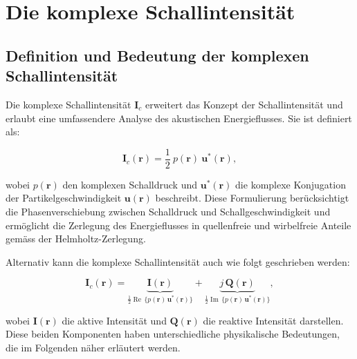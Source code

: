%
%
%
%
\section{Die komplexe Schallintensität
\label{helmholtz:section:Schallintensitaet}}

\subsection{Definition und Bedeutung der komplexen Schallintensität
\label{helmholtz:subsection:def_Schallintensitaet}}

Die komplexe Schallintensität $\mathbf{I}_c$ erweitert das Konzept der Schallintensität und erlaubt eine umfassendere Analyse des akustischen Energieflusses. Sie ist definiert als:

\begin{equation}
\mathbf{I}_c (\mathbf{r}) = \frac{1}{2} \: p(\mathbf{r}) \: \mathbf{u}^{*}(\mathbf{r}),
\label{helmholtz:equationIntensitaetKomplex}
\end{equation}

\noindent wobei $p(\mathbf{r})$ den komplexen Schalldruck und $\mathbf{u}^{*}(\mathbf{r})$ die komplexe Konjugation der Partikelgeschwindigkeit $\mathbf{u}(\mathbf{r})$ beschreibt. Diese Formulierung berücksichtigt die Phasenverschiebung zwischen Schalldruck und Schallgeschwindigkeit und ermöglicht die Zerlegung des Energieflusses in quellenfreie und wirbelfreie Anteile gemäss der Helmholtz-Zerlegung.

Alternativ kann die komplexe Schallintensität auch wie folgt geschrieben werden:

\begin{equation}
\mathbf{I}_c (\mathbf{r}) = \underbrace{\mathbf{I}(\mathbf{r})}_{\frac{1}{2} \operatorname{Re} \, \{ p(\mathbf{r}) \, \mathbf{u}^*(\mathbf{r}) \}} + \underbrace{j\,\mathbf{Q}(\mathbf{r})}_{\frac{1}{2} \operatorname{Im} \, \{ p(\mathbf{r}) \, \mathbf{u}^*(\mathbf{r}) \}},
\label{helmholtz:equationIntensitaetKomplex_2}
\end{equation}  

\noindent wobei $\mathbf{I}(\mathbf{r})$ die aktive Intensität und $\mathbf{Q}(\mathbf{r})$ die reaktive Intensität darstellen. Diese beiden Komponenten haben unterschiedliche physikalische Bedeutungen, die im Folgenden näher erläutert werden.

